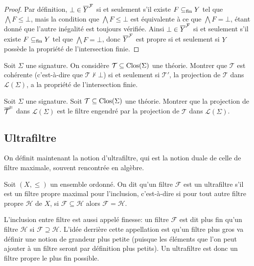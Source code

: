 \begin{proof}
  Par définition, $\bot\in \overline{Y}^{\mathcal F}$ si et seulement s'il existe $F\subseteq_{\mathrm{fin}} Y$
  tel que $\bigwedge F \leq \bot$, mais la condition que $\bigwedge F\leq \bot$
  est équivalente à ce que $\bigwedge F = \bot$, étant donné que l'autre
  inégalité est toujours vérifiée. Ainsi $\bot\in\overline{Y}^{\mathcal F}$ si et seulement
  s'il existe $F\subseteq_{\mathrm{fin}} Y$ tel que $\bigwedge F = \bot$, donc $\overline{Y}^{\mathcal F}$ est
  propre si et seulement si $Y$ possède la propriété de l'intersection finie.
\end{proof}

\begin{exercise}
  Soit $\Sigma$ une signature. On considère $\mathcal T\subseteq\operatorname{Clos}(\Sigma)$
  une théorie. Montrer que $\mathcal T$ est cohérente (c'est-à-dire que
  $\mathcal T\nvdash \bot$) si et seulement si $\mathcal T'$, la projection
  de $\mathcal T$ dans $\mathcal L(\Sigma)$, a la propriété de l'intersection
  finie.
\end{exercise}

\begin{exercise}
  Soit $\Sigma$ une signature. Soit $\mathcal T\subseteq\operatorname{Clos}(\Sigma)$ une
  théorie. Montrer que la projection de $\overline{\mathcal T}^{\vDash}$ dans
  $\mathcal L(\Sigma)$ est le filtre engendré par la projection de $\mathcal T$
  dans $\mathcal L(\Sigma)$.
\end{exercise}

\subsection{Ultrafiltre}\label{sbsct.ultrafiltre}

On définit maintenant la notion d'ultrafiltre, qui est la notion duale de celle
de filtre maximale, souvent rencontrée en algèbre.

\begin{definition}[Ultrafiltre]
  Soit $(X,\leq)$ un ensemble ordonné. On dit qu'un filtre $\mathcal F$ est un
  ultrafiltre s'il est un filtre propre maximal pour l'inclusion, c'est-à-dire si
  pour tout autre filtre propre $\mathcal H$ de $X$, si
  $\mathcal F \subseteq\mathcal H$ alors $\mathcal F = \mathcal H$.
\end{definition}

\begin{remark}
  L'inclusion entre filtre est aussi appelé \og finesse\fg : un filtre
  $\mathcal F$ est dit plus fin qu'un filtre $\mathcal H$ si
  $\mathcal F\supseteq\mathcal H$. L'idée derrière cette appellation est qu'un
  filtre plus gros va définir une notion de grandeur plus petite (puisque les
  éléments que l'on peut ajouter à un filtre seront par définition plus petits).
  Un ultrafiltre est donc un filtre propre le plus fin possible.
\end{remark}


